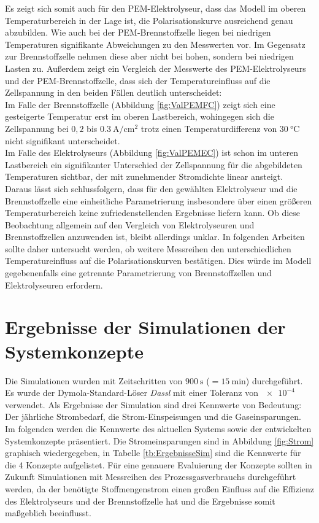Es zeigt sich somit auch für den PEM-Elektrolyseur, dass das Modell im oberen Temperaturbereich in der Lage ist, die Polarisationskurve ausreichend genau abzubilden. Wie auch bei der PEM-Brennstoffzelle liegen bei niedrigen Temperaturen signifikante Abweichungen zu den Messwerten vor. Im Gegensatz zur Brennstoffzelle nehmen diese aber nicht bei hohen, sondern bei niedrigen Lasten zu. Außerdem zeigt ein Vergleich der Messwerte des PEM-Elektrolyseurs und der PEM-Brennstoffzelle, dass sich der Temperatureinfluss auf die Zellspannung in den beiden Fällen deutlich unterscheidet:\\ 
Im Falle der Brennstoffzelle (Abbildung \ref{fig:ValPEMFC}) zeigt sich eine gesteigerte Temperatur erst im oberen Lastbereich, wohingegen sich die Zellspannung bei $0,2$ bis $\SI{0,3}{\A\per\cm\squared}$ trotz einen Temperaturdifferenz von $\SI{30}{\degreeCelsius}$ nicht signifikant unterscheidet.\\
Im Falle des Elektrolyseurs (Abbildung \ref{fig:ValPEMEC}) ist schon im unteren Lastbereich ein signifikanter Unterschied der Zellspannung für die abgebildeten Temperaturen sichtbar, der mit zunehmender Stromdichte linear ansteigt.\\

Daraus lässt sich schlussfolgern, dass für den gewählten Elektrolyseur und die Brennstoffzelle eine einheitliche Parametrierung insbesondere über einen größeren Temperaturbereich keine zufriedenstellenden Ergebnisse liefern kann. Ob diese Beobachtung allgemein auf den Vergleich von Elektrolyseuren und Brennstoffzellen anzuwenden ist, bleibt allerdings unklar. In folgenden Arbeiten sollte daher untersucht werden, ob weitere Messreihen den unterschiedlichen Temperatureinfluss auf die Polarisationskurven bestätigen. Dies würde im Modell gegebenenfalls eine getrennte Parametrierung von Brennstoffzellen und Elektrolyseuren erfordern.\\

\section{Ergebnisse der Simulationen der Systemkonzepte}
\label{sec:Ergebnisse}
Die Simulationen wurden mit Zeitschritten von $\SI{900}{\s}$ ($=\SI{15}{\minute}$) durchgeführt. Es wurde der Dymola-Standard-Löser \textit{Dassl} mit einer Toleranz von $\SI{e-4}{}$ verwendet.
Als Ergebnisse der Simulation sind drei Kennwerte von Bedeutung: Der jährliche Strombedarf, die Strom-Einspeisungen und die Gaseinsparungen. Im folgenden werden die Kennwerte des aktuellen Systems sowie der entwickelten Systemkonzepte präsentiert. Die Stromeinsparungen sind in Abbildung \ref{fig:Strom} graphisch wiedergegeben, in Tabelle \ref{tb:ErgebnisseSim} sind die Kennwerte für die 4 Konzepte aufgelistet. Für eine genauere Evaluierung der Konzepte sollten in Zukunft Simulationen mit Messreihen des Prozessgasverbrauchs durchgeführt werden, da der benötigte Stoffmengenstrom einen großen Einfluss auf die Effizienz des Elektrolyseurs und der Brennstoffzelle hat und die Ergebnisse somit maßgeblich beeinflusst.\\
 
